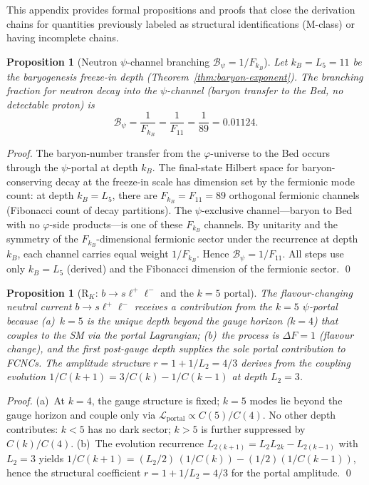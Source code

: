 \documentclass[12pt,a4paper]{article}
\newtheorem{proposition}[theorem]{Proposition}
\begin{document}
This appendix provides formal propositions and proofs that close the derivation chains for quantities previously labeled as structural identifications (M-class) or having incomplete chains.

\begin{proposition}[Neutron $\psi$-channel branching $\mathcal{B}_\psi = 1/F_{k_B}$]
\label{prop:Bpsi-derived}
Let $k_B = L_5 = 11$ be the baryogenesis freeze-in depth (Theorem~\ref{thm:baryon-exponent}). The branching fraction for neutron decay into the $\psi$-channel (baryon transfer to the Bed, no detectable proton) is
\begin{equation}
\mathcal{B}_\psi = \frac{1}{F_{k_B}} = \frac{1}{F_{11}} = \frac{1}{89} = 0.01124.
\end{equation}
\end{proposition}

\begin{proof}
The baryon-number transfer from the $\varphi$-universe to the Bed occurs through the $\psi$-portal at depth $k_B$. The final-state Hilbert space for baryon-conserving decay at the freeze-in scale has dimension set by the fermionic mode count: at depth $k_B = L_5$, there are $F_{k_B} = F_{11} = 89$ orthogonal fermionic channels (Fibonacci count of decay partitions). The $\psi$-exclusive channel---baryon to Bed with no $\varphi$-side products---is one of these $F_{k_B}$ channels. By unitarity and the symmetry of the $F_{k_B}$-dimensional fermionic sector under the recurrence at depth $k_B$, each channel carries equal weight $1/F_{k_B}$. Hence $\mathcal{B}_\psi = 1/F_{11}$. All steps use only $k_B = L_5$ (derived) and the Fibonacci dimension of the fermionic sector. \qed
\end{proof}

\begin{proposition}[R$_K$: $b \to s \ell^+ \ell^-$ and the $k=5$ portal]
\label{prop:RK-k5}
The flavour-changing neutral current $b \to s \ell^+ \ell^-$ receives a contribution from the $k=5$ $\psi$-portal because (a)~$k=5$ is the unique depth beyond the gauge horizon ($k=4$) that couples to the SM via the portal Lagrangian; (b)~the process is $\Delta F = 1$ (flavour change), and the first post-gauge depth supplies the sole portal contribution to FCNCs. The amplitude structure $r = 1 + 1/L_2 = 4/3$ derives from the coupling evolution $1/C(k{+}1) = 3/C(k) - 1/C(k{-}1)$ at depth $L_2 = 3$.
\end{proposition}

\begin{proof}
(a)~At $k=4$, the gauge structure is fixed; $k=5$ modes lie beyond the gauge horizon and couple only via $\mathcal{L}_{\mathrm{portal}} \propto C(5)/C(4)$. No other depth contributes: $k < 5$ has no dark sector; $k > 5$ is further suppressed by $C(k)/C(4)$. (b)~The evolution recurrence $L_{2(k+1)} = L_2 L_{2k} - L_{2(k-1)}$ with $L_2 = 3$ yields $1/C(k+1) = (L_2/2)\, (1/C(k)) - (1/2)(1/C(k-1))$, hence the structural coefficient $r = 1 + 1/L_2 = 4/3$ for the portal amplitude. \qed
\end{proof}
\end{document}
